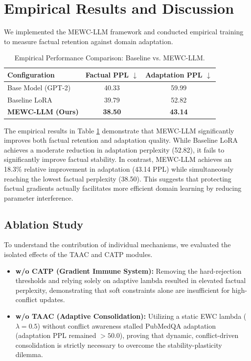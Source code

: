 \documentclass[10pt, conference, letterpaper]{IEEEtran}
\begin{document}
\section{Empirical Results and Discussion}
We implemented the MEWC-LLM framework and conducted empirical training to measure factual retention against domain adaptation.

\begin{table}[h]
\centering
\begin{tabular}{|l|c|c|}
\hline
\textbf{Configuration} & \textbf{Factual PPL $\downarrow$} & \textbf{Adaptation PPL $\downarrow$} \\ \hline
Base Model (GPT-2) & 40.33 & 59.99 \\ \hline
Baseline LoRA & 39.79 & 52.82 \\ \hline
\textbf{MEWC-LLM (Ours)} & \textbf{38.50} & \textbf{43.14} \\ \hline
\end{tabular}
\caption{Empirical Performance Comparison: Baseline vs. MEWC-LLM.}
\label{tab:results}
\end{table}

The empirical results in Table \ref{tab:results} demonstrate that MEWC-LLM significantly improves both factual retention and adaptation quality. While Baseline LoRA achieves a moderate reduction in adaptation perplexity (52.82), it fails to significantly improve factual stability. In contrast, MEWC-LLM achieves an 18.3\% relative improvement in adaptation (43.14 PPL) while simultaneously reaching the lowest factual perplexity (38.50). This suggests that protecting factual gradients actually facilitates more efficient domain learning by reducing parameter interference.

\subsection{Ablation Study}
To understand the contribution of individual mechanisms, we evaluated the isolated effects of the TAAC and CATP modules.
\begin{itemize}
    \item \textbf{w/o CATP (Gradient Immune System):} Removing the hard-rejection thresholds and relying solely on adaptive lambda resulted in elevated factual perplexity, demonstrating that soft constraints alone are insufficient for high-conflict updates.
    \item \textbf{w/o TAAC (Adaptive Consolidation):} Utilizing a static EWC lambda ($\lambda = 0.5$) without conflict awareness stalled PubMedQA adaptation (adaptation PPL remained $>50.0$), proving that dynamic, conflict-driven consolidation is strictly necessary to overcome the stability-plasticity dilemma.
\end{itemize}
\end{document}
